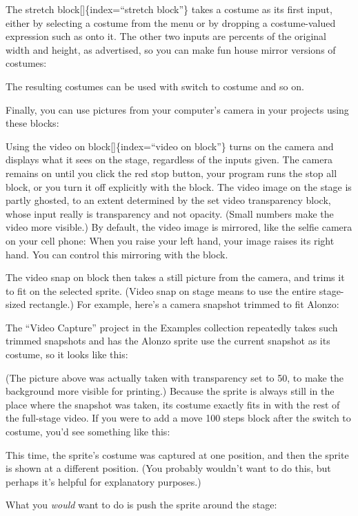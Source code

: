 \documentclass[
  letterpaper,
]{book}
\begin{document}
The stretch block{[}{]}\{index=``stretch block''\} takes a costume as
its first input, either by selecting a costume from the menu or by
dropping a costume-valued expression such as onto it. The other two
inputs are percents of the original width and height, as advertised, so
you can make fun house mirror versions of costumes:

The resulting costumes can be used with switch to costume and so on.

Finally, you can use pictures from your computer's camera in your
projects using these blocks:

Using the video on block{[}{]}\{index=``video on block''\} turns on the
camera and displays what it sees on the stage, regardless of the inputs
given. The camera remains on until you click the red stop button, your
program runs the stop all block, or you turn it off explicitly with the
block. The video image on the stage is partly ghosted, to an extent
determined by the set video transparency block, whose input really is
transparency and not opacity. (Small numbers make the video more
visible.) By default, the video image is mirrored, like the selfie
camera on your cell phone: When you raise your left hand, your image
raises its right hand. You can control this mirroring with the block.

The video snap on block then takes a still picture from the camera, and
trims it to fit on the selected sprite. (Video snap on stage means to
use the entire stage-sized rectangle.) For example, here's a camera
snapshot trimmed to fit Alonzo:

The ``Video Capture'' project in the Examples collection repeatedly
takes such trimmed snapshots and has the Alonzo sprite use the current
snapshot as its costume, so it looks like this:

(The picture above was actually taken with transparency set to 50, to
make the background more visible for printing.) Because the sprite is
always still in the place where the snapshot was taken, its costume
exactly fits in with the rest of the full-stage video. If you were to
add a move 100 steps block after the switch to costume, you'd see
something like this:

This time, the sprite's costume was captured at one position, and then
the sprite is shown at a different position. (You probably wouldn't want
to do this, but perhaps it's helpful for explanatory purposes.)

What you \emph{would} want to do is push the sprite around the stage:
\end{document}
